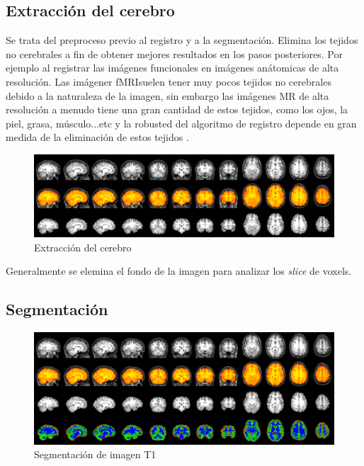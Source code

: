 \subsection{Extracción del cerebro}

Se trata del preproceso previo al registro y a la segmentación. Elimina los tejidos no cerebrales a fin de obtener mejores resultados en los pasos posteriores. Por ejemplo al registrar las imágenes funcionales en imágenes anátomicas de alta resolución. Las imágener fMRIsuelen tener muy pocos tejidos no cerebrales debido a la naturaleza de la imagen, sin embargo las imágenes MR de alta resolución a menudo tiene una gran cantidad de estos tejidos, como los ojos, la piel, grasa, músculo...etc y la robusted del algoritmo de registro depende en gran medida de la eliminación de estos tejidos \cite{bet}.

\begin{figure}[H]
  \centering
    \includegraphics[scale=0.5]{img/skull_strip.png}
  \caption{Extracción del cerebro}         \label{preproc:skull_strip}
\end{figure}

Generalmente se elemina el fondo de la imagen para analizar los \textit{slice} de voxels.

\subsection{Segmentación}

\begin{figure}[H]
  \centering
    \includegraphics[scale=0.5]{img/segmentation.png}
  \caption{Segmentación de imagen T1}         \label{preproc:segmen}
\end{figure}

